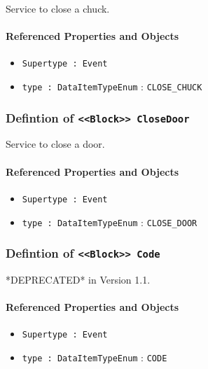 \FloatBarrier

Service to close a chuck.

\FloatBarrier
\paragraph{Referenced Properties and Objects}

\begin{itemize}
\item \texttt{Supertype : Event}

\item \texttt{type : DataItemTypeEnum} : \texttt{CLOSE_CHUCK}

\end{itemize}
\FloatBarrier
\subsubsection{Defintion of \texttt{<<Block>> CloseDoor}}
  \label{type:CloseDoor}

\FloatBarrier

Service to close a door.

\FloatBarrier
\paragraph{Referenced Properties and Objects}

\begin{itemize}
\item \texttt{Supertype : Event}

\item \texttt{type : DataItemTypeEnum} : \texttt{CLOSE_DOOR}

\end{itemize}
\FloatBarrier
\subsubsection{Defintion of \texttt{<<Block>> Code}}
  \label{type:Code}

\FloatBarrier

*DEPRECATED* in Version 1.1.

\FloatBarrier
\paragraph{Referenced Properties and Objects}

\begin{itemize}
\item \texttt{Supertype : Event}

\item \texttt{type : DataItemTypeEnum} : \texttt{CODE}

\end{itemize}
\FloatBarrier
